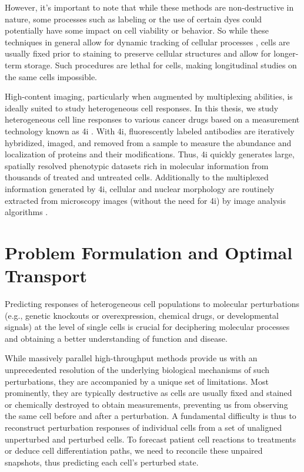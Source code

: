 However, it's important to note that while these methods are non-destructive in nature, some processes such as labeling or the use of certain dyes could potentially have some impact on cell viability or behavior. So while these techniques in general allow for dynamic tracking of cellular processes \citep{}, cells are usually fixed prior to staining to preserve cellular structures and allow for longer-term storage. Such procedures are lethal for cells, making longitudinal studies on the same cells impossible.

High-content imaging, particularly when augmented by multiplexing abilities, is ideally suited to study heterogeneous cell responses.
In this thesis, we study heterogeneous cell line responses to various cancer drugs based on a measurement technology known as \acrfull{4i} \citep{gut2018multiplexed}.
With 4i, fluorescently labeled antibodies are iteratively hybridized, imaged, and removed from a sample to measure the abundance and localization of proteins and their modifications. 
Thus, 4i quickly generates large, spatially resolved phenotypic datasets rich in molecular information from thousands of treated and untreated cells. Additionally to the multiplexed information generated by 4i, cellular and nuclear morphology are routinely extracted from microscopy images (without the need for 4i) by image analysis algorithms \citep{carpenter2006cellprofiler}.
 
\section{Problem Formulation and Optimal Transport}

Predicting responses of heterogeneous cell populations to molecular perturbations (e.g., genetic knockouts or overexpression, chemical drugs, or developmental signals) at the level of single cells is crucial for deciphering molecular processes and obtaining a better understanding of function and disease.

While massively parallel high-throughput methods provide us with an unprecedented resolution of the underlying biological mechanisms of such perturbations, they are accompanied by a unique set of limitations. Most prominently, they are typically destructive as cells are usually fixed and stained or chemically destroyed to obtain measurements, preventing us from observing the same cell before and after a perturbation. A fundamental difficulty is thus to reconstruct perturbation responses of individual cells from a set of unaligned unperturbed and perturbed cells. To forecast patient cell reactions to treatments or deduce cell differentiation paths, we need to reconcile these unpaired snapshots, thus predicting each cell's perturbed state.

